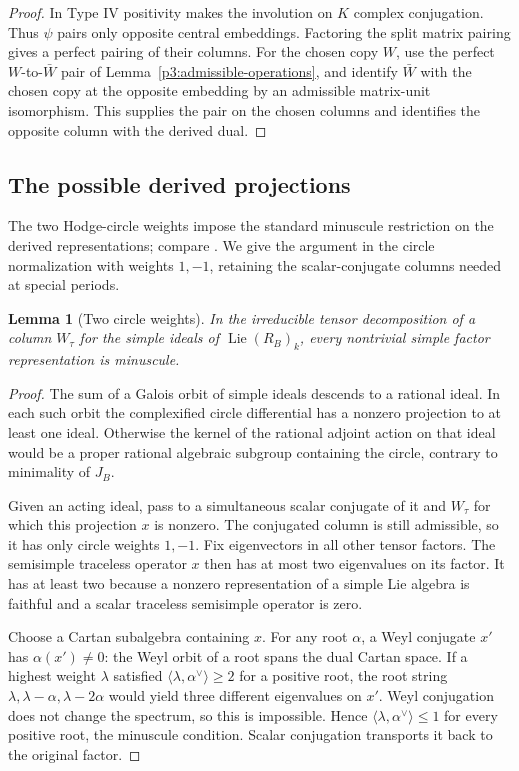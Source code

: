 \documentclass[11pt]{article}
\newtheorem{lemma}[theorem]{Lemma}
\numberwithin{equation}{section}
\begin{document}
\begin{proof}
In Type IV positivity makes the involution on \(K\) complex
conjugation.  Thus \(\psi\) pairs only opposite central embeddings.
Factoring the split matrix pairing gives a perfect pairing of their
columns.  For the chosen copy \(W\), use the perfect
\(W\)-to-\(\bar W\) pair of
Lemma~\ref{p3:admissible-operations}, and identify \(\bar W\)
with the chosen copy at the opposite embedding by an admissible
matrix-unit isomorphism.  This supplies the pair on the chosen
columns and identifies the opposite column with the derived dual.
\end{proof}

\subsection{The possible derived projections}

The two Hodge-circle weights impose the standard minuscule
restriction on the derived representations; compare
\cite[Section~3.2, Lemmas~4--5]{Serre1979HodgeTate}.
We give the argument in the circle normalization with weights
\(1,-1\), retaining the scalar-conjugate columns needed at special
periods.

\begin{lemma}[Two circle weights]
\label{p3ab:minuscule}
In the irreducible tensor decomposition of a column \(W_\tau\) for
the simple ideals of \(\operatorname{Lie}(R_B)_k\), every nontrivial
simple factor representation is minuscule.
\end{lemma}

\begin{proof}
The sum of a Galois orbit of simple ideals descends to a rational
ideal.  In each such orbit the complexified circle differential has
a nonzero projection to at least one ideal.  Otherwise the kernel
of the rational adjoint action on that ideal would be a proper
rational algebraic subgroup containing the circle, contrary to
minimality of \(J_B\).

Given an acting ideal, pass to a simultaneous scalar conjugate of
it and \(W_\tau\) for which this projection \(x\) is nonzero.
The conjugated column is still admissible, so it has only circle
weights \(1,-1\).  Fix eigenvectors in all other tensor factors.
The semisimple traceless operator \(x\) then has at most two
eigenvalues on its factor.  It has at least two because a nonzero
representation of a simple Lie algebra is faithful and a scalar
traceless semisimple operator is zero.

Choose a Cartan subalgebra containing \(x\).  For any root
\(\alpha\), a Weyl conjugate \(x'\) has \(\alpha(x')\ne0\):
the Weyl orbit of a root spans the dual Cartan space.  If a highest
weight \(\lambda\) satisfied
\(\langle\lambda,\alpha^\vee\rangle\geq2\) for a positive root,
the root string
\(\lambda,\lambda-\alpha,\lambda-2\alpha\) would yield three
different eigenvalues on \(x'\).  Weyl conjugation does not change
the spectrum, so this is impossible.  Hence
\(\langle\lambda,\alpha^\vee\rangle\leq1\) for every positive
root, the minuscule condition.  Scalar conjugation transports it
back to the original factor.
\end{proof}
\end{document}
